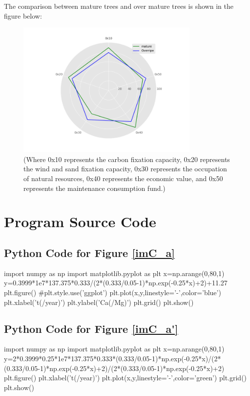 \documentclass[12pt]{article}
\begin{document}
The comparison between mature trees and over mature trees is shown in the
figure below:
\begin{figure}[ht]
    \centering
    \includegraphics[width=9cm]{News1.png}\\
    (Where 0x10 represents the carbon fixation capacity, 0x20 represents the wind and sand fixation capacity, 0x30 represents the occupation of natural resources, 0x40 represents the economic value, and 0x50 represents the maintenance consumption fund.)
\end{figure}
\onecolumn

\newpage
\printbibliography %
\newpage
\appendix
\section{Program Source Code}
\subsection{Python Code for Figure \ref{imC_a}}
\begin{python}
    import numpy as np
    import matplotlib.pyplot as plt
    x=np.arange(0,80,1)
    y=0.3999*1e7*137.375*0.333/(2*(0.333/0.05-1)*np.exp(-0.25*x)+2)+11.27
    plt.figure()
    #plt.style.use('ggplot')
    plt.plot(x,y,linestyle='-',color='blue')
    plt.xlabel('t(/year)')
    plt.ylabel('Ca(/Mg)')
    plt.grid()
    plt.show()
\end{python}
\subsection{Python Code for Figure \ref{imC_a'}}
\begin{python}
    import numpy as np
    import matplotlib.pyplot as plt
    x=np.arange(0,80,1)
    y=2*0.3999*0.25*1e7*137.375*0.333*(0.333/0.05-1)*np.exp(-0.25*x)/(2*(0.333/0.05-1)*np.exp(-0.25*x)+2)/(2*(0.333/0.05-1)*np.exp(-0.25*x)+2)
    plt.figure()
    plt.xlabel('t(/year)')
    plt.plot(x,y,linestyle='-',color='green')
    plt.grid()
    plt.show()
\end{python}
\end{document}
